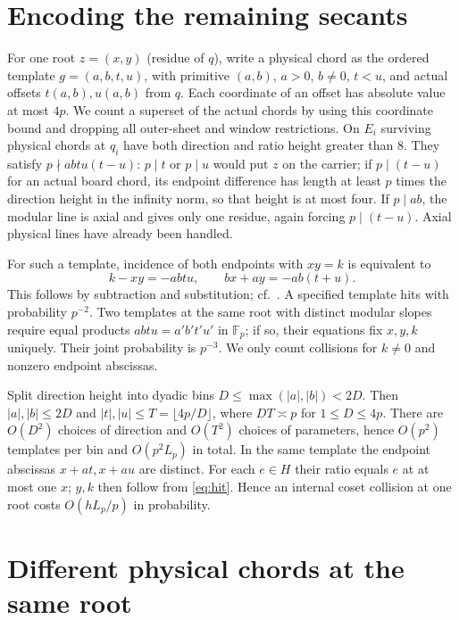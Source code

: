 \documentclass[11pt]{article}
\newcommand{\F}{\mathbb F_p}\newcommand{\G}{\mathcal G}\newcommand{\D}{\mathcal D}\newcommand{\R}{\mathcal R}\newcommand{\Z}{\mathbb Z}\newcommand{\htf}{F_{\mathrm{ht}}}\newcommand{\norm}[1]{\lVert#1\rVert_\infty}\newcommand{\Prob}{\mathbb P}\newcommand{\ch}{\chi}\newcommand{\TT}{\mathcal T}
\begin{document}
\section{Encoding the remaining secants}
For one root $z=(x,y)$ (residue of $q$), write a physical chord as the ordered template $g=(a,b,t,u)$, with primitive $(a,b)$, $a>0$, $b\ne0$, $t<u$, and actual offsets $t(a,b),u(a,b)$ from $q$. Each coordinate of an offset has absolute value at most $4p$. We count a superset of the actual chords by using this coordinate bound and dropping all outer-sheet and window restrictions. On $E_i$ surviving physical chords at $q_i$ have both direction and ratio height greater than 8. They satisfy $p\nmid abtu(t-u)$: $p\mid t$ or $p\mid u$ would put $z$ on the carrier; if $p\mid(t-u)$ for an actual board chord, its endpoint difference has length at least $p$ times the direction height in the infinity norm, so that height is at most four. If $p\mid ab$, the modular line is axial and gives only one residue, again forcing $p\mid(t-u)$. Axial physical lines have already been handled.

For such a template, incidence of both endpoints with $xy=k$ is equivalent to
\begin{equation}\label{eq:hit}
 k-xy=-abtu,\qquad bx+ay=-ab(t+u).
\end{equation}
This follows by subtraction and substitution; cf.\ \cite[\S2]{root}. A specified template hits with probability $p^{-2}$. Two templates at the same root with distinct modular slopes require equal products $abtu=a'b't'u'$ in $\F$; if so, their equations fix $x,y,k$ uniquely. Their joint probability is $p^{-3}$. We only count collisions for $k\ne0$ and nonzero endpoint abscissas.

Split direction height into dyadic bins $D\le\max(|a|,|b|)<2D$. Then $|a|,|b|\le 2D$ and $|t|,|u|\le T=\lfloor4p/D\rfloor$, where $DT\asymp p$ for $1\le D\le4p$. There are $O(D^2)$ choices of direction and $O(T^2)$ choices of parameters, hence $O(p^2)$ templates per bin and $O(p^2L_p)$ in total. In the same template the endpoint abscissas $x+at,x+au$ are distinct. For each $e\in H$ their ratio equals $e$ at at most one $x$; $y,k$ then follow from \eqref{eq:hit}. Hence an internal coset collision at one root costs $O(hL_p/p)$ in probability.

\section{Different physical chords at the same root}
\end{document}
